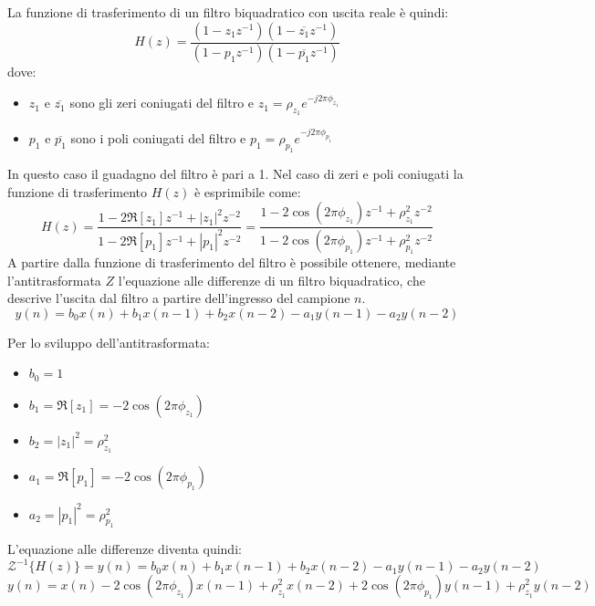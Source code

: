\documentclass[12pt]{report}
\begin{document}
La funzione di trasferimento di un filtro biquadratico con uscita reale è quindi:
\begin{equation}
    H(z)=\frac{(1-z_1z^{-1})(1-\overline{z_1}z^{-1})}{(1-p_1z^{-1})(1-\overline{p_1}z^{-1})}
    \label{eq:simmetric_digital_biquad}
\end{equation}
dove:
\begin{itemize}
    \item \(z_1\) e \(\overline{z_1}\) sono gli zeri coniugati del filtro e \(z_1=\rho_{z_1} e^{-j2\pi \phi_{z_1}} \)
    \item \(p_1\) e \(\overline{p_1}\) sono i poli coniugati del filtro e \(p_1=\rho_{p_1} e^{-j2\pi \phi_{p_1}} \)
\end{itemize}
In questo caso il guadagno del filtro è pari a 1.
Nel caso di zeri e poli coniugati la funzione di trasferimento \(H(z)\) è esprimibile come:
\begin{equation}
    H(z) = \frac{1 - 2\Re[z_1]z^{-1}+|z_1|^2z^{-2}}{1 - 2\Re[p_1]z^{-1}+|p_1|^2z^{-2}}=\frac{1 - 2\cos(2\pi \phi_{z_1})z^{-1}+\rho_{z_1}^2z^{-2}}{1 - 2\cos(2\pi \phi_{p_1})z^{-1}+\rho_{p_1}^2z^{-2}}
    \label{eq: digital_biquad_H}
\end{equation}
A partire dalla funzione di trasferimento del filtro è possibile ottenere, mediante l'antitrasformata \(Z\) l'equazione alle differenze di un filtro biquadratico, che descrive l'uscita dal filtro a partire dell'ingresso del campione \(n\).
\begin{equation}
    y(n)=b_0x(n)+b_1x(n-1)+b_2x(n-2) - a_1y(n-1) - a_2y(n-2)
    \label{eq:eq_differenze_generale}
\end{equation}

Per lo sviluppo dell'antitrasformata:
\begin{itemize}
    \item \(b_0 = 1\)
    \item \(b_1=\Re[z_1]=- 2\cos(2\pi \phi_{z_1}) \)
    \item \(b_2=|z_1|^2= \rho_{z_1}^2\)
    \item \(a_1=\Re[p_1]=- 2\cos(2\pi \phi_{p_1}) \)
    \item \(a_2=|p_1|^2= \rho_{p_1}^2\)
\end{itemize}
L'equazione alle differenze diventa quindi:
\begin{equation}
    \mathcal{Z}^{-1}\{H(z)\} =  y(n)=b_0x(n)+b_1x(n-1)+b_2x(n-2) - a_1y(n-1) - a_2y(n-2)
    \label{eq:biquad_eq_differenze}
\end{equation}
\begin{equation}
    y(n) = x(n) - 2\cos(2\pi \phi_{z_1})x(n-1) + \rho_{z_1}^2x(n-2) + 2\cos(2\pi \phi_{p_1})y(n-1) + \rho_{z_1}^2y(n-2)
    \label{eq:biquad_eq_differenze_risolta}
\end{equation}
\end{document}
